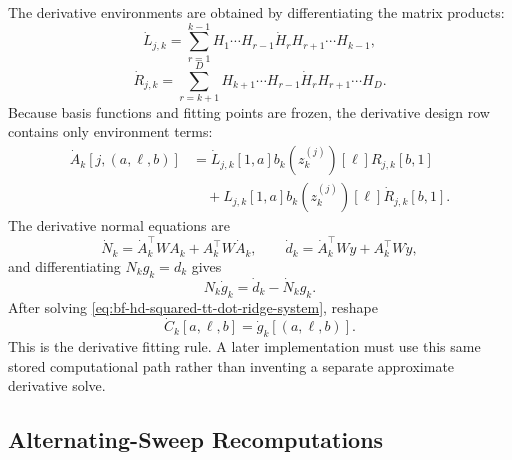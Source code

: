 The derivative environments are obtained by differentiating the matrix products:
\begin{equation}
  \dot L_{j,k}
  =
  \sum_{r=1}^{k-1}H_1\cdots H_{r-1}\dot H_r H_{r+1}\cdots H_{k-1},
  \label{eq:bf-hd-squared-tt-dot-L}
\end{equation}
\begin{equation}
  \dot R_{j,k}
  =
  \sum_{r=k+1}^{D}H_{k+1}\cdots H_{r-1}\dot H_r H_{r+1}\cdots H_D.
  \label{eq:bf-hd-squared-tt-dot-R}
\end{equation}
Because basis functions and fitting points are frozen, the derivative design row
contains only environment terms:
\begin{equation}
\begin{aligned}
  \dot A_k[j,(a,\ell,b)]
  &=
  \dot L_{j,k}[1,a]b_k(z_k^{(j)})[\ell]R_{j,k}[b,1]\\
  &\quad+
  L_{j,k}[1,a]b_k(z_k^{(j)})[\ell]\dot R_{j,k}[b,1].
\end{aligned}
  \label{eq:bf-hd-squared-tt-dot-design-row}
\end{equation}
The derivative normal equations are
\begin{equation}
  \dot N_k=\dot A_k^\top W A_k+A_k^\top W\dot A_k,
  \qquad
  \dot d_k=\dot A_k^\top Wy+A_k^\top W\dot y,
  \label{eq:bf-hd-squared-tt-dot-normal-equations}
\end{equation}
and differentiating \(N_kg_k=d_k\) gives
\begin{equation}
  N_k\dot g_k=\dot d_k-\dot N_k g_k.
  \label{eq:bf-hd-squared-tt-dot-ridge-system}
\end{equation}
After solving \eqref{eq:bf-hd-squared-tt-dot-ridge-system}, reshape
\begin{equation}
  \dot C_k[a,\ell,b]=\dot g_k[(a,\ell,b)].
  \label{eq:bf-hd-squared-tt-dot-core-reshape}
\end{equation}
This is the derivative fitting rule.  A later implementation must use this same
stored computational path rather than inventing a separate approximate derivative
solve.

\subsection{Alternating-Sweep Recomputations}
\label{sec:bf-hd-squared-tt-sweep-recomputations}

